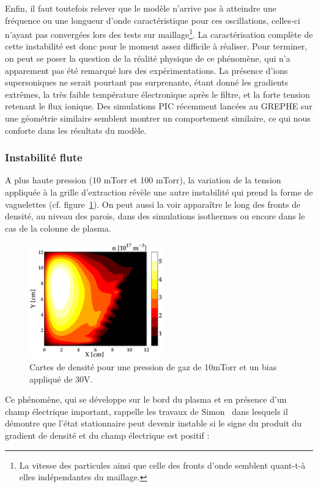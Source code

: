 \begin{refsection}
Enfin, il faut toutefois relever que le modèle n'arrive pas à atteindre 
une fréquence ou une longueur d'onde caractéristique pour ces oscillations,
celles-ci n'ayant pas convergées lors des tests sur maillage\footnote{La
vitesse des particules ainsi que celle des fronts d'onde semblent quant-t-à
elles indépendantes du maillage.}.
La caractérisation complète de cette instabilité est donc pour le moment
assez difficile à réaliser.
Pour terminer, on peut se poser la question de la réalité physique de
ce phénomène, qui n'a apparement pas été remarqué lors des expérimentations. La
présence d'ions supersoniques ne serait pourtant pas surprenante, étant donné
les gradients extrêmes, la très faible température électronique 
après le filtre, et la forte tension retenant le flux ionique.
Des simulations PIC récemment lancées au GREPHE sur une géométrie similaire
semblent montrer un comportement similaire, ce qui nous conforte dans les
résultats du modèle.

	\subsubsection{Instabilité flute}
	A plus haute pression (10 mTorr et 100 mTorr), la variation de la tension
	appliquée à la grille d'extraction révèle une autre instabilité qui prend la
	forme de vaguelettes (cf.
	figure~\ref{4-PegasesCarteDensiteVarBias5}). On peut aussi la voir apparaître
	le long des fronts de densité, au niveau des parois, dans des
	simulations isothermes ou encore dans le cas de la colonne de plasma.
		
\begin{figure}[!htbp]
  \centering
    \includegraphics[height=5cm]{figures/4-PegasesCarteDensiteVarBias5.eps}
    \caption{Cartes de densité pour une pression de gaz de 10mTorr et un bias
    appliqué de 30V.\label{4-PegasesCarteDensiteVarBias5}}
\end{figure}
	
	Ce phénomène, qui se développe sur le bord du plasma et
	en présence d'un champ électrique important, rappelle
	les travaux de Simon~\parencite{Simon63} dans lesquels il démontre que l'état
	stationnaire peut devenir instable si le signe du produit du
	gradient de densité et du champ électrique est positif :
	

\end{refsection}
